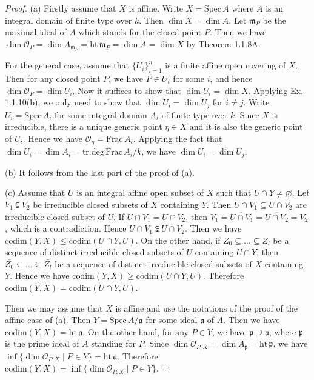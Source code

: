 \begin{proof}
	(a) Firstly assume that $X$ is affine. Write $X=\mathrm{Spec}\,A$ where $A$ is an integral domain of finite type over $k$. Then $\dim X=\dim A$. Let $\mathfrak{m}_P$ be the maximal ideal of $A$ which stands for the closed point $P$. Then we have $\dim\mathcal{O}_P=\dim A_{\mathfrak{m}_P}=\mathrm{ht}\,\mathfrak{m}_P=\dim A=\dim X$ by Theorem 1.1.8A.
	
	For the general case, assume that $\{U_i\}_{i=1}^n$ is a finite affine open covering of $X$. Then for any closed point $P$, we have $P\in U_i$ for some $i$, and hence $\dim\mathcal{O}_P=\dim U_i$. Now it suffices to show that $\dim U_i=\dim X$. Applying Ex. 1.1.10(b), we only need to show that $\dim U_i=\dim U_j$ for $i\neq j$. Write $U_i=\mathrm{Spec}\,A_i$ for some integral domain $A_i$ of finite type over $k$. Since $X$ is irreducible, there is a unique generic point $\eta\in X$ and it is also the generic point of $U_i$. Hence we have $\mathcal{O}_{\eta}=\mathrm{Frac}\,A_i$. Applying the fact that $\dim U_i=\dim A_i=\mathrm{tr.deg}\,\mathrm{Frac}\,A_i/k$, we have $\dim U_i=\dim U_j$.
	
	(b) It follows from the last part of the proof of (a).
	
	(c) Assume that $U$ is an integral affine open subset of $X$ such that $U\cap Y\neq\varnothing$. Let $V_1\subsetneqq V_2$ be irreducible closed subsets of $X$ containing $Y$. Then $U\cap V_1\subseteq U\cap V_2$ are irreducible closed subset of $U$. If $U\cap V_1= U\cap V_2$, then $V_1=\overline{U\cap V_1}=\overline{U\cap V_2}=V_2$, which is a contradiction. Hence $U\cap V_1\subsetneqq U\cap V_2$. Then we have $\mathrm{codim}(Y,X)\leq\mathrm{codim}(U\cap Y,U)$. On the other hand, if $Z_0\subseteq\dots\subseteq Z_l$ be a sequence of distinct irreducible closed subsets of $U$ containing $U\cap Y$, then $\bar{Z_0}\subseteq\dots\subseteq\bar{Z_l}$ be a sequence of distinct irreducible closed subsets of $X$ containing $Y$. Hence we have $\mathrm{codim}(Y,X)\geq\mathrm{codim}(U\cap Y,U)$. Therefore $\mathrm{codim}(Y,X)=\mathrm{codim}(U\cap Y,U)$.
	
	Then we may assume that $X$ is affine and use the notations of the proof of the affine case of (a). Then $Y=\mathrm{Spec}\,A/\mathfrak{a}$ for some ideal $\mathfrak{a}$ of $A$. Then we have $\mathrm{codim}(Y,X)=\mathrm{ht}\,\mathfrak{a}$. On the other hand, for any $P\in Y$, we have $\mathfrak{p}\supseteq\mathfrak{a}$, where $\mathfrak{p}$ is the prime ideal of $A$ standing for $P$. Since $\dim\mathcal{O}_{P,X}=\dim A_{\mathfrak{p}}=\mathrm{ht}\,\mathfrak{p}$, we have $\inf\{\dim\mathcal{O}_{P,X}\mid P\in Y\}=\mathrm{ht}\,\mathfrak{a}$. Therefore $\mathrm{codim}(Y,X)=\inf\{\dim\mathcal{O}_{P,X}\mid P\in Y\}$.
	

\end{proof}
